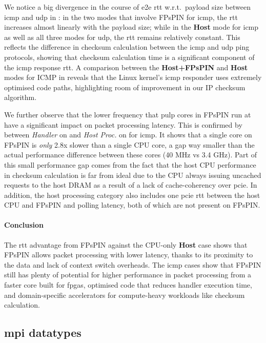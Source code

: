 We notice a big divergence in the course of \ac{e2e} \ac{rtt} w.r.t.\ payload size between \ac{icmp} and \ac{udp} in : in the two modes that involve FPsPIN for \ac{icmp}, the \ac{rtt} increases almost linearly with the payload size; while in the \textbf{Host} mode for \ac{icmp} as well as all three modes for \ac{udp},  the \ac{rtt} remains relatively constant.  This reflects the difference in checksum calculation between the \ac{icmp} and \ac{udp} ping protocols, showing that checksum calculation time is a significant component of the \ac{icmp} response \ac{rtt}.  A comparison between the \textbf{Host+FPsPIN} and \textbf{Host} modes for ICMP in  reveals that the Linux kernel's \ac{icmp} responder uses extremely optimised code paths, highlighting room of improvement in our IP checksum algorithm.

We further observe that the lower frequency that \ac{pulp} cores in FPsPIN run at have a significant impact on packet processing latency.  This is confirmed by  between \emph{Handler} on  and \emph{Host Proc.} on  for \ac{icmp}.  It shows that a single core on FPsPIN is \emph{only} \mytilde{}2.8x slower than a single CPU core, a gap way smaller than the actual performance difference between these cores (40 MHz vs 3.4 GHz).  Part of this small performance gap comes from the fact that the host CPU performance in checksum calculation is far from ideal due to the CPU always issuing uncached requests to the host DRAM as a result of a lack of cache-coherency over \ac{pcie}.  In addition, the host processing category also includes one \ac{pcie} \ac{rtt} between the host CPU and FPsPIN and polling latency, both of which are not present on FPsPIN.

\paragraph{Conclusion} The \ac{rtt} advantage from FPsPIN against the CPU-only \textbf{Host} case shows that FPsPIN allows packet processing with lower latency, thanks to its proximity to the data and lack of context switch overheads.  The \ac{icmp} cases show that FPsPIN still has plenty of potential for higher performance in packet processing from a faster core built for \ac{fpga}s, optimised code that reduces handler execution time, and domain-specific accelerators for compute-heavy workloads like checksum calculation.

\subsection{\acs{mpi} datatypes} \label{sec:mpi-datatypes-demo}

